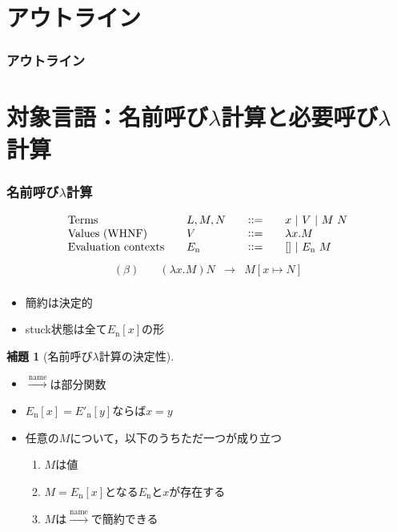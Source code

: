 \documentclass[dvipdfmx,cjk,xcolor=dvipsnames,envcountsect,notheorems,12pt]{beamer}
\theoremstyle{definition}
\newtheorem{lemma}{補題}
\newcommand{\CALLBYNAME}{\xrightarrow{\mathrm{name}}}
\begin{document}
\section*{アウトライン}
\begin{frame}
  \frametitle{アウトライン}
  \tableofcontents[sectionstyle=show,subsectionstyle=hide]
\end{frame}

\section{対象言語：名前呼び$\lambda$計算と必要呼び$\lambda$計算}

\begin{frame}
	\frametitle{名前呼び$\lambda$計算}
	\large
	\[ \begin{array}{llcl}
		\mbox{Terms}\quad & L,M,N\quad & \vcentcolon\vcentcolon=\quad & x~|~V~|~M~N \\
		\mbox{Values (WHNF)}\quad & V\quad & \vcentcolon\vcentcolon=\quad & \lambda x.M \\
		\mbox{Evaluation contexts}\quad & E_\mathrm{n}\quad & \vcentcolon\vcentcolon=\quad & [] ~|~ E_\mathrm{n}~M \\
	\end{array} \]
	\[ \begin{array}{lrcl}
		(\beta)\quad & (\lambda x.M)N & \rightarrow & M[x \mapsto N] \\
	\end{array} \]
	\begin{itemize}
		\item 簡約は決定的
		\item stuck状態は全て$E_\mathrm{n}[x]$の形
	\end{itemize}
\end{frame}

\begin{frame}
	\begin{lemma}[名前呼び$\lambda$計算の決定性]
	\begin{itemize}
		\item $\CALLBYNAME$は部分関数
		\item $E_\mathrm{n}[x]=E'_\mathrm{n}[y]$ならば$x=y$
		\item 任意の$M$について，以下のうちただ一つが成り立つ
			\begin{enumerate}
				\item $M$は値
				\item $M=E_\mathrm{n}[x]$となる$E_\mathrm{n}$と$x$が存在する
				\item $M$は$\CALLBYNAME$で簡約できる
			\end{enumerate}
	\end{itemize}
	\end{lemma}
\end{frame}
\end{document}
